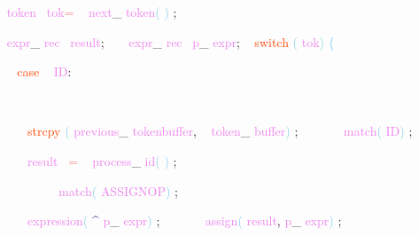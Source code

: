 \documentclass[8, usernames, dvipsnames]{beamer}
\begin{document}
\begin{frame}
\textcolor{White}{\   }
\textcolor{Violet}{token}\textcolor{White}{\ }
\textcolor{Violet}{tok}\textcolor{Salmon}{=}
\textcolor{White}{\ }
\textcolor{Violet}{next}\textcolor{Sepia}{\_}
\textcolor{Violet}{token}\textcolor{SkyBlue}{(}
\textcolor{SkyBlue}{)}
\textcolor{Sepia}{;}

 \textcolor{White}{\   }
\textcolor{Violet}{expr}\textcolor{Sepia}{\_}
\textcolor{Violet}{rec}\textcolor{White}{\ }
\textcolor{Violet}{result}\textcolor{Sepia}{;}
\textcolor{White}{\ }
\textcolor{White}{\   }
\textcolor{Violet}{expr}\textcolor{Sepia}{\_}
\textcolor{Violet}{rec}\textcolor{White}{\ }
\textcolor{Violet}{p}\textcolor{Sepia}{\_}
\textcolor{Violet}{expr}\textcolor{Sepia}{;}
\textcolor{White}{\   }
\textcolor{OrangeRed}{switch}
\textcolor{SkyBlue}{(}
\textcolor{Violet}{tok}\textcolor{SkyBlue}{)}
\textcolor{SkyBlue}{\{ }

 \textcolor{White}{\   }
\textcolor{White}{\   }
\textcolor{OrangeRed}{case}
\textcolor{White}{\ }
\textcolor{Violet}{ID}\textcolor{Sepia}{:}

 \textcolor{White}{\   }
\textcolor{White}{\   }
\textcolor{White}{\   }

 \textcolor{White}{\   }
\textcolor{White}{\   }
\textcolor{White}{\   }
\textcolor{OrangeRed}{strcpy}
\textcolor{SkyBlue}{(}
\textcolor{Violet}{previous}\textcolor{Sepia}{\_}
\textcolor{Violet}{tokenbuffer}\textcolor{Sepia}{,}
\textcolor{White}{\ }
\textcolor{Violet}{token}\textcolor{Sepia}{\_}
\textcolor{Violet}{buffer}\textcolor{SkyBlue}{)}
\textcolor{Sepia}{;}
\textcolor{White}{\ }
\textcolor{White}{\   }
\textcolor{White}{\   }
\textcolor{White}{\   }
\textcolor{Violet}{match}\textcolor{SkyBlue}{(}
\textcolor{Violet}{ID}\textcolor{SkyBlue}{)}
\textcolor{Sepia}{;}

 \textcolor{White}{\   }
\textcolor{White}{\   }
\textcolor{White}{\   }
\textcolor{Violet}{result}\textcolor{White}{\ }
\textcolor{Salmon}{=}
\textcolor{White}{\ }
\textcolor{Violet}{process}\textcolor{Sepia}{\_}
\textcolor{Violet}{id}\textcolor{SkyBlue}{(}
\textcolor{SkyBlue}{)}
\textcolor{Sepia}{;}

 \textcolor{White}{\   }
\textcolor{White}{\   }
\textcolor{White}{\   }
\textcolor{White}{\   }
\textcolor{White}{\   }
\textcolor{White}{\   }
\textcolor{Violet}{match}\textcolor{SkyBlue}{(}
\textcolor{Violet}{ASSIGNOP}\textcolor{SkyBlue}{)}
\textcolor{Sepia}{;}

 \textcolor{White}{\   }
\textcolor{White}{\   }
\textcolor{White}{\   }
\textcolor{Violet}{expression}\textcolor{SkyBlue}{(}
\textcolor{MidnightBlue}{\textasciicircum}
\textcolor{Violet}{p}\textcolor{Sepia}{\_}
\textcolor{Violet}{expr}\textcolor{SkyBlue}{)}
\textcolor{Sepia}{;}
\textcolor{White}{\ }
\textcolor{White}{\   }
\textcolor{White}{\   }
\textcolor{White}{\   }
\textcolor{Violet}{assign}\textcolor{SkyBlue}{(}
\textcolor{Violet}{result}\textcolor{Sepia}{,}
\textcolor{Violet}{p}\textcolor{Sepia}{\_}
\textcolor{Violet}{expr}\textcolor{SkyBlue}{)}
\textcolor{Sepia}{;}


\end{frame}
\end{document}
